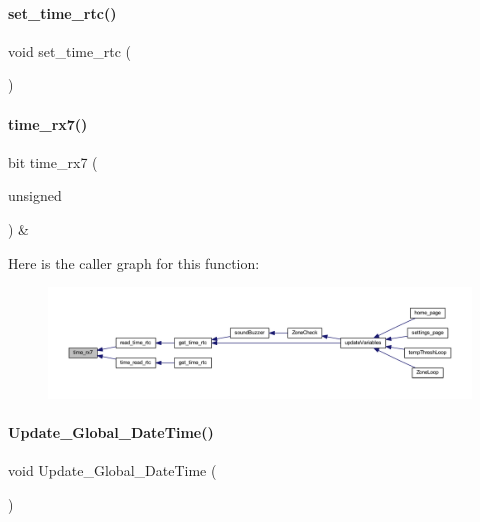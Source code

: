 \paragraph{set\+\_\+time\+\_\+rtc()}
{\footnotesize\ttfamily void set\+\_\+time\+\_\+rtc (\begin{DoxyParamCaption}{ }\end{DoxyParamCaption})}

\mbox{\label{a00017_a64b918d8106cc55aaced41002a03eeec}} 
\paragraph{time\+\_\+rx7()}
{\footnotesize\ttfamily bit time\+\_\+rx7 (\begin{DoxyParamCaption}\item[{unsigned}]{ }\end{DoxyParamCaption}) \&}

Here is the caller graph for this function\+:
\nopagebreak
\begin{figure}[H]
\begin{center}
\leavevmode
\includegraphics[width=350pt]{a00017_a64b918d8106cc55aaced41002a03eeec_icgraph}
\end{center}
\end{figure}
\mbox{\label{a00017_a93b2ace39d0d582b18b136c908d8f092}} 
\paragraph{Update\+\_\+\+Global\+\_\+\+Date\+Time()}
{\footnotesize\ttfamily void Update\+\_\+\+Global\+\_\+\+Date\+Time (\begin{DoxyParamCaption}{ }\end{DoxyParamCaption})}

